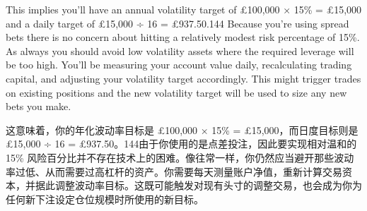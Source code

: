 \bipairgap

\begin{englishblock} This implies you'll have an annual volatility target of £100,000 × 15\% = £15,000 and a daily target of £15,000 ÷ 16 = £937.50.144 Because you're using spread bets there is no concern about hitting a relatively modest risk percentage of 15\%. As always you should avoid low volatility assets where the required leverage will be too high. You'll be measuring your account value daily, recalculating trading capital, and adjusting your volatility target accordingly. This might trigger trades on existing positions and the new volatility target will be used to size any new bets you make. \end{englishblock}

\begin{chineseblock}这意味着，你的年化波动率目标是 £100,000 × 15\% = £15,000，而日度目标则是 £15,000 ÷ 16 = £937.50。144由于你使用的是点差投注，因此要实现相对温和的 15\% 风险百分比并不存在技术上的困难。像往常一样，你仍然应当避开那些波动率过低、从而需要过高杠杆的资产。你需要每天测量账户净值，重新计算交易资本，并据此调整波动率目标。这既可能触发对现有头寸的调整交易，也会成为你为任何新下注设定仓位规模时所使用的新目标。\end{chineseblock}


